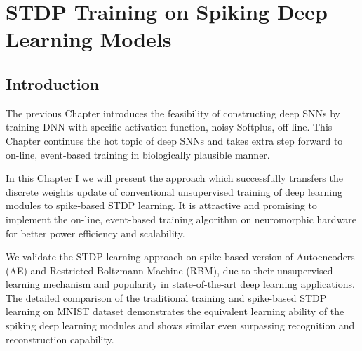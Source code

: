 \chapter{STDP Training on Spiking Deep Learning Models}
\label{cha:sdlm}
\section{Introduction}
The previous Chapter introduces the feasibility of constructing deep SNNs by training DNN with specific activation function, noisy Softplus, off-line.
This Chapter continues the hot topic of deep SNNs and takes extra step forward to on-line, event-based training in biologically plausible manner.

In this Chapter I we will present the approach which successfully transfers the discrete weights update of conventional unsupervised training of deep learning modules to spike-based STDP learning.
It is attractive and promising to implement the on-line, event-based training algorithm on neuromorphic hardware for better power efficiency and scalability.

We validate the STDP learning approach on spike-based version of Autoencoders (AE) and Restricted Boltzmann Machine (RBM), due to their unsupervised learning mechanism and popularity in state-of-the-art deep learning applications.
The detailed comparison of the traditional training and spike-based STDP learning on MNIST dataset demonstrates the equivalent learning ability of the spiking deep learning modules and shows similar even surpassing recognition and reconstruction capability.



